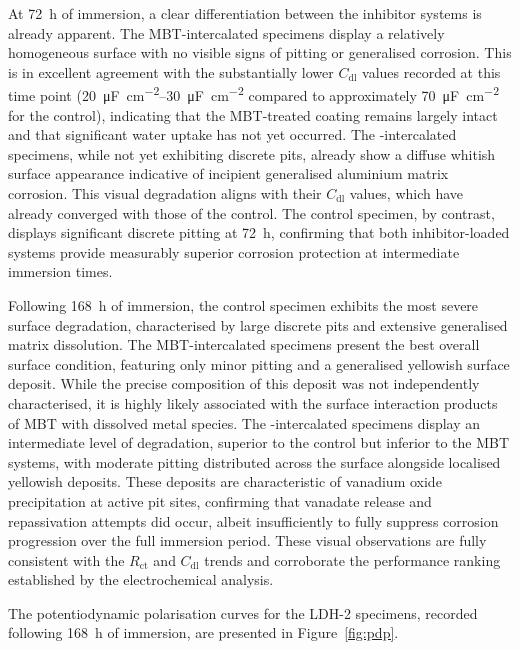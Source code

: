 \documentclass[11pt,twoside,a4paper,final]{report}
\begin{document}
At \qty{72}{\hour} of immersion, a clear differentiation between the inhibitor systems is already apparent. The MBT-intercalated specimens display a relatively homogeneous surface with no visible signs of pitting or generalised corrosion. This is in excellent agreement with the substantially lower $C_{\text{dl}}$ values recorded at this time point (\qtyrange{20}{30}{\micro\farad\per\square\centi\meter} compared to approximately \qty{70}{\micro\farad\per\square\centi\meter} for the control), indicating that the MBT-treated coating remains largely intact and that significant water uptake has not yet occurred. The -intercalated specimens, while not yet exhibiting discrete pits, already show a diffuse whitish surface appearance indicative of incipient generalised aluminium matrix corrosion. This visual degradation aligns with their $C_{\text{dl}}$ values, which have already converged with those of the control. The control specimen, by contrast, displays significant discrete pitting at \qty{72}{\hour}, confirming that both inhibitor-loaded systems provide measurably superior corrosion protection at intermediate immersion times.

Following \qty{168}{\hour} of immersion, the control specimen exhibits the most severe surface degradation, characterised by large discrete pits and extensive generalised matrix dissolution. The MBT-intercalated specimens present the best overall surface condition, featuring only minor pitting and a generalised yellowish surface deposit. While the precise composition of this deposit was not independently characterised, it is highly likely associated with the surface interaction products of MBT with dissolved metal species. The -intercalated specimens display an intermediate level of degradation, superior to the control but inferior to the MBT systems, with moderate pitting distributed across the surface alongside localised yellowish deposits. These deposits are characteristic of vanadium oxide precipitation at active pit sites, confirming that vanadate release and repassivation attempts did occur, albeit insufficiently to fully suppress corrosion progression over the full immersion period. These visual observations are fully consistent with the $R_{\text{ct}}$ and $C_{\text{dl}}$ trends and corroborate the performance ranking established by the electrochemical analysis.

The potentiodynamic polarisation curves for the LDH-2 specimens, recorded following \qty{168}{\hour} of immersion, are presented in Figure~\ref{fig:pdp}. 
\end{document}
